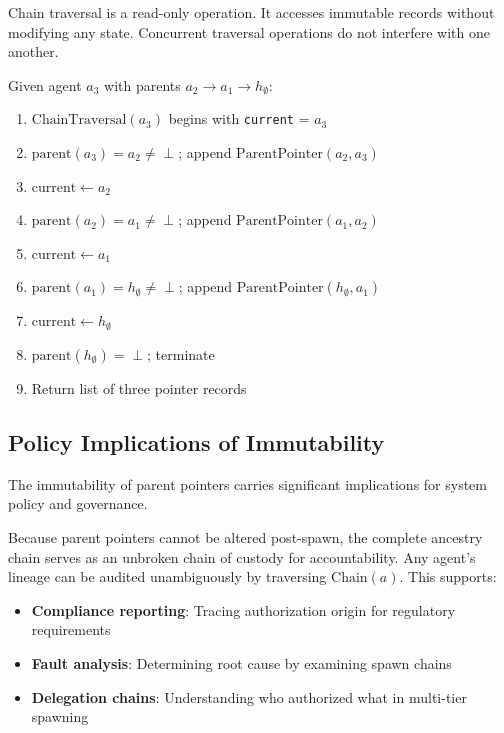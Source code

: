 \begin{note}
Chain traversal is a read-only operation. It accesses immutable records without modifying any state. Concurrent traversal operations do not interfere with one another.
\end{note}

\begin{example}
Given agent $a_3$ with parents $a_2 \to a_1 \to h_\emptyset$:
\begin{enumerate}
    \item $\text{ChainTraversal}(a_3)$ begins with \texttt{current} = $a_3$
    \item $\text{parent}(a_3) = a_2 \neq \perp$; append $\text{ParentPointer}(a_2, a_3)$
    \item $\text{current} \leftarrow a_2$
    \item $\text{parent}(a_2) = a_1 \neq \perp$; append $\text{ParentPointer}(a_1, a_2)$
    \item $\text{current} \leftarrow a_1$
    \item $\text{parent}(a_1) = h_\emptyset \neq \perp$; append $\text{ParentPointer}(h_\emptyset, a_1)$
    \item $\text{current} \leftarrow h_\emptyset$
    \item $\text{parent}(h_\emptyset) = \perp$; terminate
    \item Return list of three pointer records
\end{enumerate}
\end{example}

\subsection{Policy Implications of Immutability}

The immutability of parent pointers carries significant implications for system policy and governance.

\begin{policy}
Because parent pointers cannot be altered post-spawn, the complete ancestry chain serves as an unbroken chain of custody for accountability. Any agent's lineage can be audited unambiguously by traversing $\text{Chain}(a)$. This supports:
\begin{itemize}
    \item \textbf{Compliance reporting}: Tracing authorization origin for regulatory requirements
    \item \textbf{Fault analysis}: Determining root cause by examining spawn chains
    \item \textbf{Delegation chains}: Understanding who authorized what in multi-tier spawning
\end{itemize}
\end{policy}

